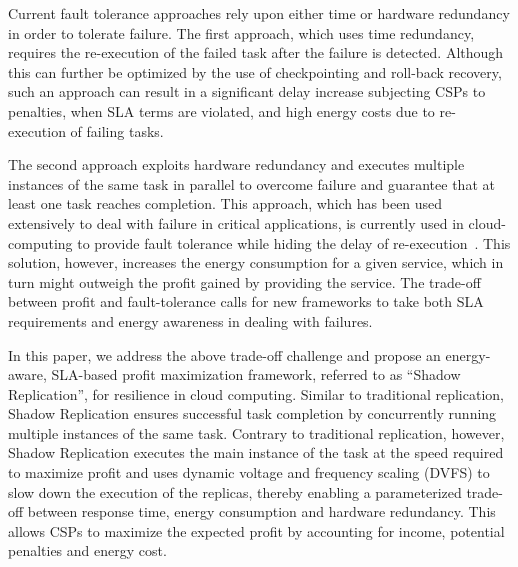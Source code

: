 Current fault tolerance approaches rely upon either time or hardware
redundancy in order to tolerate failure. The first approach, which
uses time redundancy, requires the re-execution of the failed task
after the failure is detected.  Although this can further be optimized
by the use of checkpointing and roll-back recovery, such an approach
can result in a significant delay increase subjecting CSPs to penalties, when SLA terms are violated,
and high energy costs due to re-execution of failing tasks.



The second approach exploits hardware redundancy and executes multiple
instances of the same task in parallel to overcome failure and
guarantee that at least one task reaches completion.  This approach,
which has been used extensively to deal with failure in critical
applications, is currently used in cloud-computing to provide fault
tolerance while hiding the delay of
re-execution~\cite{tsai_isads_2011,ko_socc_2010}. This solution,
however, increases the energy consumption for a given service, which
in turn might outweigh the profit gained by providing the service.
The trade-off between profit and fault-tolerance calls for new
frameworks to take both SLA requirements and energy awareness in
dealing with failures.

In this paper, we address the above trade-off challenge and propose an
energy-aware, SLA-based profit maximization framework, referred to as
``Shadow Replication'', for resilience in cloud computing.  Similar to
traditional replication, Shadow Replication ensures successful task
completion by concurrently running multiple instances of the same
task. Contrary to traditional replication, however, Shadow Replication
executes the main instance of the task at the speed required to
maximize profit and uses dynamic voltage and frequency scaling (DVFS)
to slow down the execution of the replicas, thereby enabling a
parameterized trade-off between response time, energy consumption and
hardware redundancy. This allows CSPs to maximize the expected profit
by accounting for income, potential penalties and energy cost.


